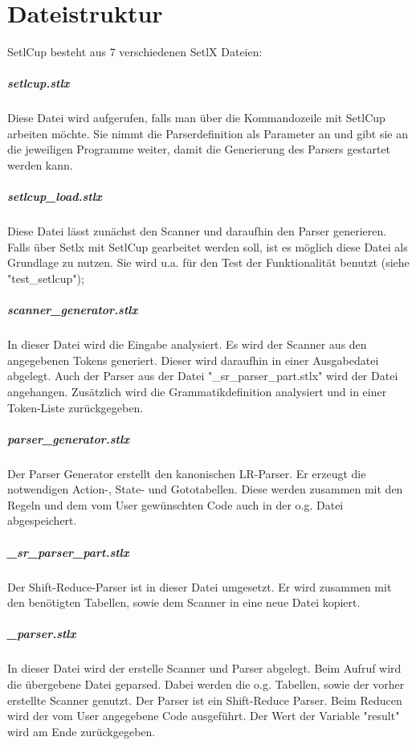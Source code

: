 \chapter{Dateistruktur}
SetlCup besteht aus 7 verschiedenen SetlX Dateien:
\paragraph{setlcup.stlx} Diese Datei wird aufgerufen, falls man über die Kommandozeile mit SetlCup arbeiten möchte. Sie nimmt die Parserdefinition als Parameter an und gibt sie an die jeweiligen Programme weiter, damit die Generierung des Parsers gestartet werden kann.
\paragraph{setlcup\_load.stlx} Diese Datei lässt zunächst den Scanner und daraufhin den Parser generieren. Falls über Setlx mit SetlCup gearbeitet werden soll, ist es möglich diese Datei als Grundlage zu nutzen. Sie wird u.a. für den Test der Funktionalität benutzt (siehe "test\_setlcup");
\paragraph{scanner\_generator.stlx} In dieser Datei wird die Eingabe analysiert. Es wird der Scanner aus den angegebenen Tokens generiert. Dieser wird daraufhin in einer Ausgabedatei abgelegt. Auch der Parser aus der Datei "\_sr\_parser\_part.stlx" wird der Datei angehangen. Zusätzlich wird die Grammatikdefinition analysiert und  in einer Token-Liste zurückgegeben.
\paragraph{parser\_generator.stlx} Der Parser Generator erstellt den kanonischen LR-Parser. Er erzeugt die notwendigen Action-, State- und Gototabellen. Diese werden zusammen mit den Regeln und dem vom User gewünschten Code auch in der o.g. Datei abgespeichert. 
\paragraph{\_sr\_parser\_part.stlx} Der Shift-Reduce-Parser ist in dieser Datei umgesetzt. Er wird zusammen mit den benötigten Tabellen, sowie dem Scanner in eine neue Datei kopiert. 
\paragraph{\_parser.stlx} In dieser Datei wird der erstelle Scanner und Parser abgelegt. Beim Aufruf wird die übergebene Datei geparsed. Dabei werden die o.g. Tabellen, sowie der vorher erstellte Scanner genutzt. Der Parser ist ein Shift-Reduce Parser. Beim Reducen wird der vom User angegebene Code ausgeführt. Der Wert der Variable "result" wird am Ende zurückgegeben.
